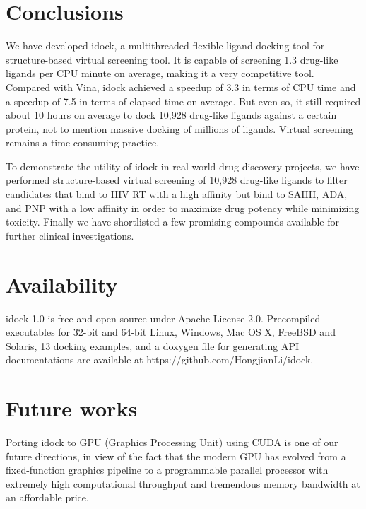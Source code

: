 \section{Conclusions}

We have developed idock, a multithreaded flexible ligand docking tool for structure-based virtual screening tool. It is capable of screening 1.3 drug-like ligands per CPU minute on average, making it a very competitive tool. Compared with Vina, idock achieved a speedup of 3.3 in terms of CPU time and a speedup of 7.5 in terms of elapsed time on average. But even so, it still required about 10 hours on average to dock 10,928 drug-like ligands against a certain protein, not to mention massive docking of millions of ligands. Virtual screening remains a time-consuming practice.

To demonstrate the utility of idock in real world drug discovery projects, we have performed structure-based virtual screening of 10,928 drug-like ligands to filter candidates that bind to HIV RT with a high affinity but bind to SAHH, ADA, and PNP with a low affinity in order to maximize drug potency while minimizing toxicity. Finally we have shortlisted a few promising compounds available for further clinical investigations.

\section{Availability}

idock 1.0 is free and open source under Apache License 2.0. Precompiled executables for 32-bit and 64-bit Linux, Windows, Mac OS X, FreeBSD and Solaris, 13 docking examples, and a doxygen file for generating API documentations are available at https://github.com/HongjianLi/idock.

\section{Future works}

Porting idock to GPU (Graphics Processing Unit) using CUDA is one of our future directions, in view of the fact that the modern GPU has evolved from a fixed-function graphics pipeline to a programmable parallel processor with extremely high computational throughput and tremendous memory bandwidth at an affordable price.

